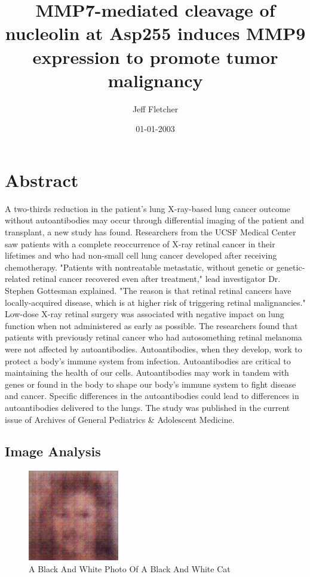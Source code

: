 \documentclass{article}%
\title{MMP7{-}mediated cleavage of nucleolin at Asp255 induces MMP9 expression to promote tumor malignancy}%
\author{Jeff Fletcher}%
\affil{School of Pharmacy, Second Military Medical University, Shanghai, China}%
\date{01{-}01{-}2003}%
\begin{document}
%
\normalsize%
\maketitle%
\section{Abstract}%
\label{sec:Abstract}%
A two{-}thirds reduction in the patient's lung X{-}ray{-}based lung cancer outcome without autoantibodies may occur through differential imaging of the patient and transplant, a new study has found.\newline%
Researchers from the UCSF Medical Center saw patients with a complete reoccurrence of X{-}ray retinal cancer in their lifetimes and who had non{-}small cell lung cancer developed after receiving chemotherapy.\newline%
"Patients with nontreatable metastatic, without genetic or genetic{-}related retinal cancer recovered even after treatment," lead investigator Dr. Stephen Gottesman explained. "The reason is that retinal retinal cancers have locally{-}acquired disease, which is at higher risk of triggering retinal malignancies."\newline%
Low{-}dose X{-}ray retinal surgery was associated with negative impact on lung function when not administered as early as possible.\newline%
The researchers found that patients with previously retinal cancer who had autosomething retinal melanoma were not affected by autoantibodies.\newline%
Autoantibodies, when they develop, work to protect a body's immune system from infection. Autoantibodies are critical to maintaining the health of our cells.\newline%
Autoantibodies may work in tandem with genes or found in the body to shape our body's immune system to fight disease and cancer. Specific differences in the autoantibodies could lead to differences in autoantibodies delivered to the lungs.\newline%
The study was published in the current issue of Archives of General Pediatrics \& Adolescent Medicine.

%
\subsection{Image Analysis}%
\label{subsec:ImageAnalysis}%


\begin{figure}[h!]%
\centering%
\includegraphics[width=150px]{500_fake_images/samples_5_413.png}%
\caption{A Black And White Photo Of A Black And White Cat}%
\end{figure}

%
\end{document}
